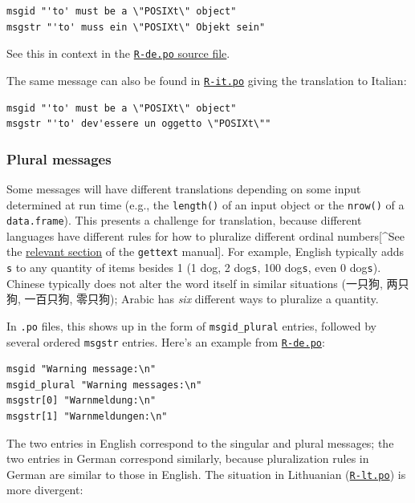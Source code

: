 \documentclass[
]{book}
\begin{document}
\begin{verbatim}
msgid "'to' must be a \"POSIXt\" object"
msgstr "'to' muss ein \"POSIXt\" Objekt sein"
\end{verbatim}

See this in context in the \href{https://svn.r-project.org/R/trunk/src/library/base/po/R-de.po}{\texttt{R-de.po} source file}.

The same message can also be found in
\href{https://svn.r-project.org/R/trunk/src/library/base/po/R-it.po}{\texttt{R-it.po}}
giving the translation to Italian:

\begin{verbatim}
msgid "'to' must be a \"POSIXt\" object"
msgstr "'to' dev'essere un oggetto \"POSIXt\""
\end{verbatim}

\hypertarget{plural-messages}{%
\subsubsection{Plural messages}\label{plural-messages}}

Some messages will have different translations depending on some input determined at run time (e.g., the \texttt{length()} of
an input object or the \texttt{nrow()} of a \texttt{data.frame}). This presents a challenge for translation, because different languages
have different rules for how to pluralize different ordinal
numbers{[}\^{}See the \href{https://www.gnu.org/software/gettext/manual/html_node/Plural-forms.html}{relevant section} of the \texttt{gettext} manual{]}.
For example, English typically adds \texttt{s} to any quantity of items besides 1 (1 dog, 2 dog\texttt{s}, 100 dog\texttt{s}, even 0 dog\texttt{s}).
Chinese typically does not alter the word itself in similar situations (一只狗, 两只狗, 一百只狗, 零只狗); Arabic has \emph{six}
different ways to pluralize a quantity.

In \texttt{.po} files, this shows up in the form of \texttt{msgid\_plural} entries, followed by several ordered \texttt{msgstr} entries. Here's an example from
\href{https://github.com/r-devel/r-svn/blob/c715d61cb74b3fee2d035faed9b258e86e420b75/src/library/base/po/R-de.po\#L2015-L2018}{\texttt{R-de.po}}:

\begin{verbatim}
msgid "Warning message:\n"
msgid_plural "Warning messages:\n"
msgstr[0] "Warnmeldung:\n"
msgstr[1] "Warnmeldungen:\n"
\end{verbatim}

The two entries in English correspond to the singular and plural messages; the two entries in German correspond similarly, because
pluralization rules in German are similar to those in English. The situation in Lithuanian
(\href{https://github.com/r-devel/r-svn/blob/c715d61cb74b3fee2d035faed9b258e86e420b75/src/library/base/po/R-lt.po\#L1999-L2003}{\texttt{R-lt.po}})
is more divergent:
\end{document}
